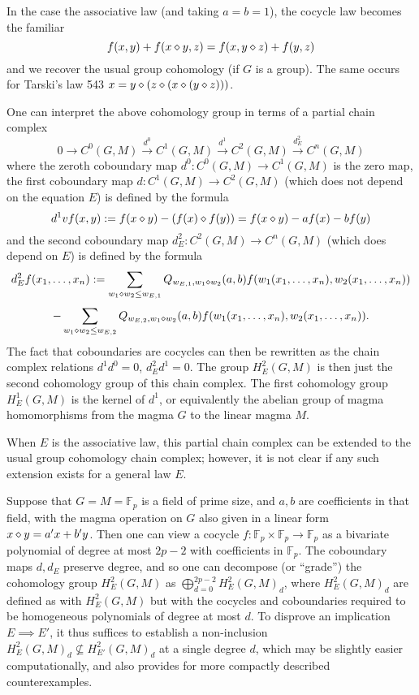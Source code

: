 \begin{remark} In the case the associative law (and taking $a=b=1$), the cocycle law becomes the familiar
  $$ f(x,y) + f(x \diamond y, z) = f(x, y \diamond z) + f(y,z)$$
and we recover the usual group cohomology (if $G$ is a group).  The same occurs for Tarski's law 543
$x = y \diamond (z \diamond (x \diamond (y \diamond z)))$.
\end{remark}

\begin{remark}  One can interpret the above cohomology group in terms of a partial chain complex
$$ 0 \to C^0(G,M) \stackrel{d^0}{\to} C^1(G,M) \stackrel{d^1}{\to} C^2(G,M) \stackrel{d^2_E}{\to} C^n(G,M)$$
where the zeroth coboundary map $d^0: C^0(G,M) \to C^1(G,M)$ is the zero map, the first coboundary map $d: C^1(G,M) \to C^2(G,M)$ (which does not depend on the equation $E$) is defined by the formula
$$ d^1 vf(x,y) := f(x \diamond y) - (f(x) \diamond f(y)) = f(x \diamond y) - af(x) - bf(y)$$
and the second coboundary map $d^2_E: C^2(G,M) \to C^n(G,M)$ (which does depend on $E$) is defined by the formula
$$ d^2_E f(x_1,\dots,x_n) := \sum_{w_1 \diamond w_2 \leq w_{E,1}} Q_{w_{E,1},w_1 \diamond w_2}(a,b) f(w_1(x_1,\dots,x_n), w_2(x_1,\dots,x_n))$$
$$ - \sum_{w_1 \diamond w_2 \leq w_{E,2}} Q_{w_{E,2},w_1 \diamond w_2}(a,b) f(w_1(x_1,\dots,x_n), w_2(x_1,\dots,x_n)).$$
The fact that coboundaries are cocycles can then be rewritten as the chain complex relations $d^1 d^0=0$, $d^2_E d^1 = 0$.  The group $H^2_E(G,M)$ is then just the second cohomology group of this chain complex.  The first cohomology group $H^1_E(G,M)$ is the kernel of $d^1$, or equivalently the abelian group of magma homomorphisms from the magma $G$ to the linear magma $M$.

When $E$ is the associative law, this partial chain complex can be extended to the usual group cohomology chain complex; however, it is not clear if any such extension exists for a general law $E$.
\end{remark}

\begin{remark}  Suppose that $G = M = \mathbb{F}_p$ is a field of prime size, and $a,b$ are coefficients in that field, with the magma operation on $G$ also given in a linear form $x \diamond y = a'x  + b' y$.  Then one can view a cocycle $f: \mathbb{F}_p \times \mathbb{F}_p \to \mathbb{F}_p$ as a bivariate polynomial of degree at most $2p-2$ with coefficients in $ \mathbb{F}_p$.  The coboundary maps $d, d_E$ preserve degree, and so one can decompose (or ``grade'') the cohomology group $H^2_E(G,M)$ as $\bigoplus_{d=0}^{2p-2} H^2_E(G,M)_d$, where $H^2_E(G,M)_d$ are defined as with $H^2_E(G,M)$ but with the cocycles and coboundaries required to be homogeneous polynomials of degree at most $d$.  To disprove an implication $E \implies E'$, it thus suffices to establish a non-inclusion $H^2_E(G,M)_d \not\subseteq H^2_{E'}(G,M)_d$ at a single degree $d$, which may be slightly easier computationally, and also provides for more compactly described counterexamples.
\end{remark}
